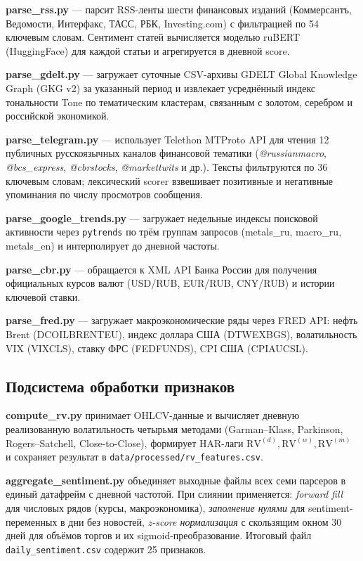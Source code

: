 \textbf{parse\_rss.py} --- парсит RSS-ленты шести финансовых изданий
(Коммерсантъ, Ведомости, Интерфакс, ТАСС, РБК, Investing.com)
с фильтрацией по 54 ключевым словам.
Сентимент статей вычисляется моделью ruBERT (HuggingFace) для каждой статьи
и агрегируется в дневной score.

\textbf{parse\_gdelt.py} --- загружает суточные CSV-архивы
GDELT Global Knowledge Graph (GKG v2) за указанный период
и извлекает усреднённый индекс тональности Tone по тематическим кластерам,
связанным с золотом, серебром и российской экономикой.

\textbf{parse\_telegram.py} --- использует Telethon MTProto API
для чтения 12 публичных русскоязычных каналов финансовой тематики
(\textit{@russianmacro}, \textit{@bcs\_express}, \textit{@cbrstocks},
\textit{@markettwits} и др.).
Тексты фильтруются по 36 ключевым словам; лексический scorer
взвешивает позитивные и негативные упоминания по числу просмотров сообщения.

\textbf{parse\_google\_trends.py} --- загружает недельные индексы
поисковой активности через \texttt{pytrends} по трём группам запросов
(metals\_ru, macro\_ru, metals\_en) и интерполирует до дневной частоты.

\textbf{parse\_cbr.py} --- обращается к XML API Банка России
для получения официальных курсов валют (USD/RUB, EUR/RUB, CNY/RUB)
и истории ключевой ставки.

\textbf{parse\_fred.py} --- загружает макроэкономические ряды
через FRED API: нефть Brent (DCOILBRENTEU), индекс доллара США (DTWEXBGS),
волатильность VIX (VIXCLS), ставку ФРС (FEDFUNDS), CPI США (CPIAUCSL).

\subsection{Подсистема обработки признаков}

\textbf{compute\_rv.py} принимает OHLCV-данные и вычисляет
дневную реализованную волатильность четырьмя методами
(Garman--Klass, Parkinson, Rogers--Satchell, Close-to-Close),
формирует HAR-лаги $\mathrm{RV}^{(d)}, \mathrm{RV}^{(w)}, \mathrm{RV}^{(m)}$
и сохраняет результат в \texttt{data/processed/rv\_features.csv}.

\textbf{aggregate\_sentiment.py} объединяет выходные файлы всех семи
парсеров в единый датафрейм с дневной частотой.
При слиянии применяется:
\textit{forward fill} для числовых рядов (курсы, макроэкономика),
\textit{заполнение нулями} для sentiment-переменных в дни без новостей,
\textit{z-score нормализация} с скользящим окном 30 дней
для объёмов торгов и их sigmoid-преобразование.
Итоговый файл \texttt{daily\_sentiment.csv} содержит 25 признаков.

